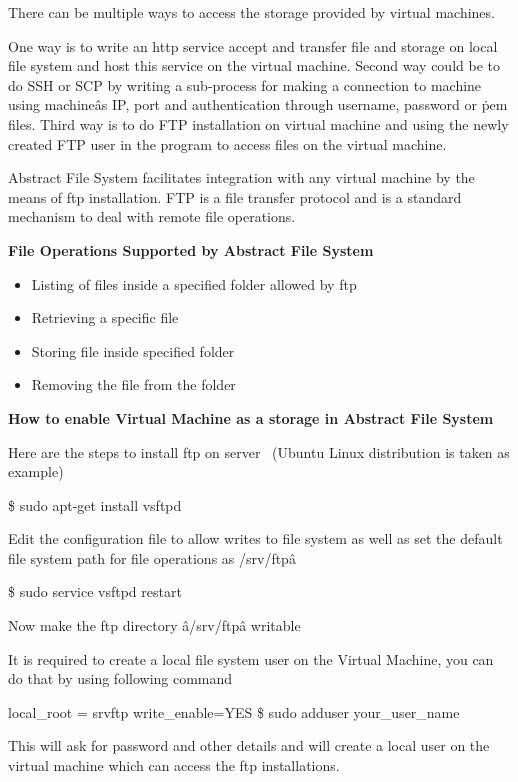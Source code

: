 There can be multiple ways to access the storage provided by virtual machines. 

One way is to write an http service accept and transfer file and storage on 
local file system and host this service on the virtual machine. Second way 
could be to do SSH or SCP by writing a sub-process for making a connection to 
machine using machineâs IP, port and authentication through username, 
password or \.pem files. Third way is to do FTP installation on virtual 
machine and using the newly created FTP user in the program to access files on 
the virtual machine.


Abstract File System facilitates integration with any virtual machine by the 
means of ftp installation. FTP is a file transfer protocol and is a standard 
mechanism to deal with remote file operations.


\textbf{File Operations Supported by Abstract File System }
\begin{itemize}
    \item  Listing of files inside a specified folder allowed by ftp
    \item  Retrieving a specific file 
    \item  Storing file inside specified folder
    \item  Removing the file from the folder
\end{itemize}   

\textbf{How to enable Virtual Machine as a storage in Abstract File System}

Here are the steps to install ftp on server~\cite{hid-sp18-420-FTP}
(Ubuntu Linux distribution is taken as example)


\$ sudo apt-get install vsftpd


Edit the configuration file to allow writes to file system as well as set the 
default file system path for file operations as \/srv/ftpâ


\$ sudo service vsftpd restart


Now make the ftp directory â/srv/ftpâ writable 


It is required to create a local file system user on the Virtual Machine, you 
can do that by using following command

	
local\_root = \/srv\/ftp  
write\_enable=YES       
\$ sudo adduser your\_user\_name    


This will ask for password and other details and will create a local user on 
the virtual machine which can access the ftp installations.

